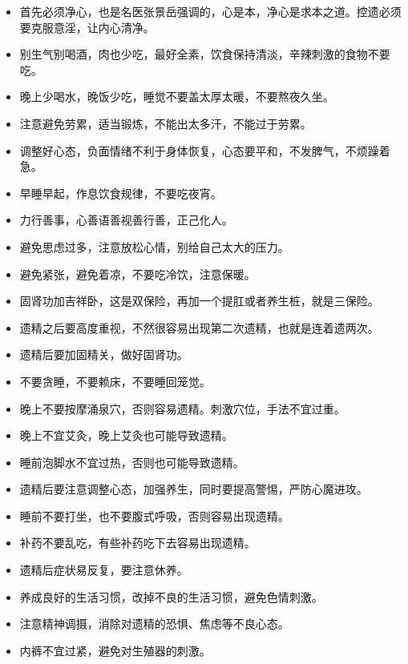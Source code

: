 \begin{multicols}{2}
    \begin{itemize}
        \item 首先必须净心，也是名医张景岳强调的，心是本，净心是求本之道。控遗必须要克服意淫，让内心清净。
        \item 别生气别喝酒，肉也少吃，最好全素，饮食保持清淡，辛辣刺激的食物不要吃。
        \item 晚上少喝水，晚饭少吃，睡觉不要盖太厚太暖，不要熬夜久坐。
        \item 注意避免劳累，适当锻炼，不能出太多汗，不能过于劳累。
        \item 调整好心态，负面情绪不利于身体恢复，心态要平和，不发脾气，不烦躁着急。
        \item 早睡早起，作息饮食规律，不要吃夜宵。
        \item 力行善事，心善语善视善行善，正己化人。
        \item 避免思虑过多，注意放松心情，别给自己太大的压力。
        \item 避免紧张，避免着凉，不要吃冷饮，注意保暖。
        \item 固肾功加吉祥卧，这是双保险，再加一个提肛或者养生桩，就是三保险。
        \item 遗精之后要高度重视，不然很容易出现第二次遗精，也就是连着遗两次。
        \item 遗精后要加固精关，做好固肾功。
        \item 不要贪睡，不要赖床，不要睡回笼觉。
        \item 晚上不要按摩涌泉穴，否则容易遗精。刺激穴位，手法不宜过重。
        \item 晚上不宜艾灸，晚上艾灸也可能导致遗精。
        \item 睡前泡脚水不宜过热，否则也可能导致遗精。
        \item 遗精后要注意调整心态，加强养生，同时要提高警惕，严防心魔进攻。
        \item 睡前不要打坐，也不要腹式呼吸，否则容易出现遗精。
        \item 补药不要乱吃，有些补药吃下去容易出现遗精。
        \item 遗精后症状易反复，要注意休养。
        \item 养成良好的生活习惯，改掉不良的生活习惯，避免色情刺激。
        \item 注意精神调摄，消除对遗精的恐惧、焦虑等不良心态。
        \item 内裤不宜过紧，避免对生殖器的刺激。
    \end{itemize}
\end{multicols}

